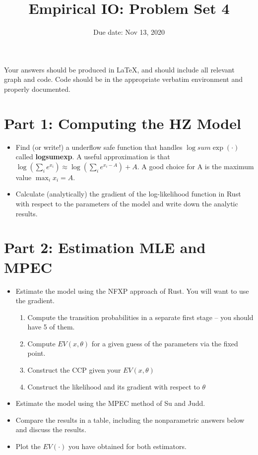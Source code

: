 \documentclass{article}
\title{Empirical IO: Problem Set 4}
\begin{document}
\small
\date{Due date: Nov 13, 2020}
\maketitle
Your answers should be produced in \LaTeX, and should include all relevant graph and code.  Code should be in the appropriate verbatim environment and properly documented.
\section*{Part 1: Computing the HZ Model}
\begin{itemize}
\item Find (or write!) a underflow safe function that handles $\log sum \exp (\cdot)$ called \textbf{logsumexp}. A useful approximation is that $\log (\sum_i e^{x_i}) \approx \log (\sum_i e^{x_i -A}) +A$. A good choice for A is the maximum value $\max_i x_i = A$.
\item Calculate (analytically) the gradient of the log-likelihood function in Rust with respect to the parameters of the model and write down the analytic results.
\end{itemize}

\section*{Part 2: Estimation MLE and MPEC}
\begin{itemize}
\item Estimate the model using the NFXP approach of Rust. You will want to use the gradient.
\begin{enumerate}
\item Compute the transition probabilities in a separate first stage -- you should have 5 of them.
\item Compute $EV(x, \theta)$ for a given guess of the parameters via the fixed point.
\item Construct the CCP given your $EV(x, \theta)$
\item Construct the likelihood and its gradient with respect to $\theta$
\end{enumerate}
\item Estimate the model using the MPEC method of Su and Judd.
\item Compare the results in a table, including the nonparametric answers below and discuss the results.
\item Plot the $EV(\cdot)$ you have obtained for both estimators.
\end{itemize}
\end{document}
